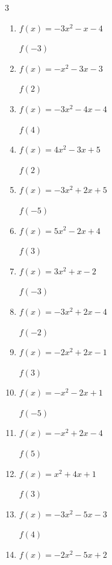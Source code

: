 \begin{multicols}{3}
\begin{enumerate}
$f(3)$
        \phantom{$= 26$}

  \item $f(x)=-3x^{2}-x-4$

$f(-3)$
        \phantom{$= -28$}

  \item $f(x)=-x^{2}-3x-3$

$f(2)$
        \phantom{$= -13$}

  \item $f(x)=-3x^{2}-4x-4$

$f(4)$
        \phantom{$= -68$}

  \item $f(x)=4x^{2}-3x+5$

$f(2)$
        \phantom{$= 15$}

  \item $f(x)=-3x^{2}+2x+5$

$f(-5)$
        \phantom{$= -80$}

  \item $f(x)=5x^{2}-2x+4$

$f(3)$
        \phantom{$= 43$}

  \item $f(x)=3x^{2}+x-2$

$f(-3)$
        \phantom{$= 22$}

\columnbreak %

\resetques

  \item $f(x)=-3x^{2}+2x-4$

$f(-2)$
        \phantom{$= -20$}

  \item $f(x)=-2x^{2}+2x-1$

$f(3)$
        \phantom{$= -13$}

  \item $f(x)=-x^{2}-2x+1$

$f(-5)$
        \phantom{$= -14$}

  \item $f(x)=-x^{2}+2x-4$

$f(5)$
        \phantom{$= -19$}

  \item $f(x)=x^{2}+4x+1$

$f(3)$
        \phantom{$= 22$}

  \item $f(x)=-3x^{2}-5x-3$

$f(4)$
        \phantom{$= -71$}

  \item $f(x)=-2x^{2}-5x+2$


\end{enumerate}
\end{multicols}
